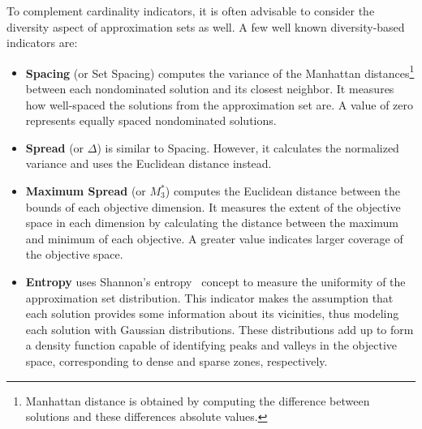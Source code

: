 	To complement cardinality indicators, it is often advisable to consider the diversity aspect of approximation sets as well. A few well known diversity-based indicators are:
	\begin{itemize}
		\item  \textbf{Spacing} (or Set Spacing) computes the variance of the Manhattan distances\footnote{Manhattan distance is obtained by computing the difference between solutions and these differences absolute values.} between each nondominated solution and its closest neighbor. It measures how well-spaced the solutions from the approximation set are. A value of zero represents equally spaced nondominated solutions. 
		\item \textbf{Spread} (or $\Delta$) is similar to Spacing. However, it calculates the normalized variance and uses the Euclidean distance instead.
		\item \textbf{Maximum Spread} (or \textbf{$M_3^\ast$}) computes the Euclidean distance between the bounds of each objective dimension. It measures the extent of the objective space in each dimension by calculating the distance between the maximum and minimum of each objective. A greater value indicates larger coverage of the objective space.
		
		\item \textbf{Entropy} uses Shannon's entropy~\cite{Shannon1948} concept to measure the uniformity of the approximation set distribution. This indicator makes the assumption that each solution provides some information about its vicinities, thus modeling each solution with Gaussian distributions. These distributions add up to form a density function capable of identifying peaks and valleys in the objective space, corresponding to dense and sparse zones, respectively. 
		

\end{itemize}
